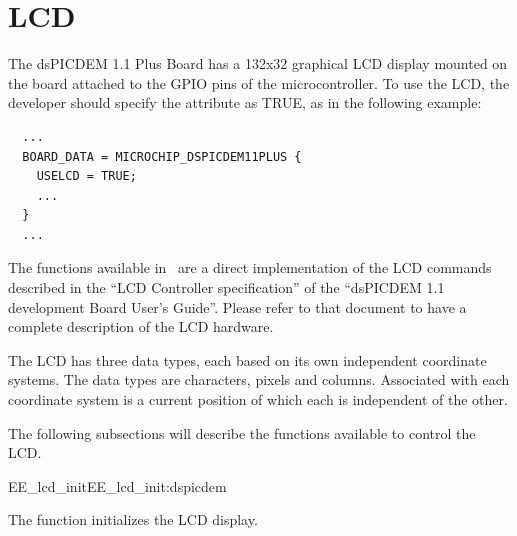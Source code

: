 
\section{LCD}

The dsPICDEM 1.1 Plus Board has a 132x32 graphical LCD display mounted
on the board attached to the GPIO pins of the microcontroller. To use
the LCD, the developer should specify the  attribute as
TRUE, as in the following example:

\begin{lstlisting}
  ...
  BOARD_DATA = MICROCHIP_DSPICDEM11PLUS {
    USELCD = TRUE;
    ...
  }
  ...
\end{lstlisting}

The functions available in \ee\ are a direct implementation of the LCD
commands described in the ``LCD Controller specification'' of the
``dsPICDEM 1.1 development Board User's Guide''. Please refer to that
document to have a complete description of the LCD hardware.

The LCD has three data types, each based on its own independent
coordinate systems. The data types are characters, pixels and
columns. Associated with each coordinate system is a current position
of which each is independent of the other.

The following subsections will describe the functions available to
control the LCD.


\begin{function_nopb2}{EE\_lcd\_init}{EE_lcd_init:dspicdem}
  
  \begin{fundescription}
    The function initializes the LCD display.
  \end{fundescription}
  
  
  
\end{function_nopb2}

